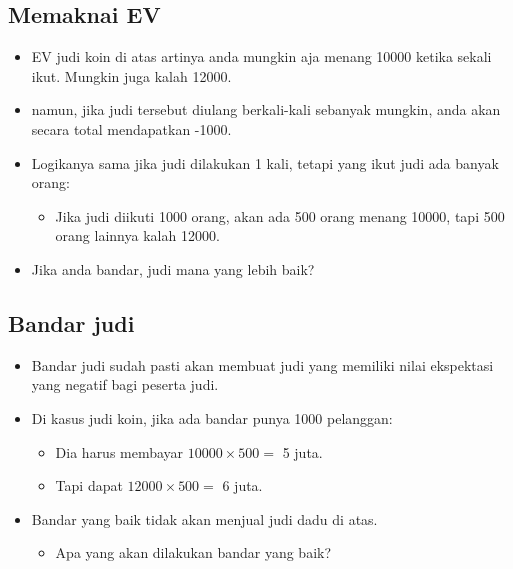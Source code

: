 \documentclass[
  letterpaper,
  DIV=11,
  numbers=noendperiod]{scrartcl}
\providecommand{\tightlist}{%
  \setlength{\itemsep}{0pt}\setlength{\parskip}{0pt}}\usepackage{longtable,booktabs,array}
\begin{document}
\subsection{Memaknai EV}\label{memaknai-ev}

\begin{itemize}
\item
  EV judi koin di atas artinya anda mungkin aja menang 10000 ketika
  sekali ikut. Mungkin juga kalah 12000.
\item
  namun, jika judi tersebut diulang berkali-kali sebanyak mungkin, anda
  akan secara total mendapatkan -1000.
\item
  Logikanya sama jika judi dilakukan 1 kali, tetapi yang ikut judi ada
  banyak orang:

  \begin{itemize}
  \tightlist
  \item
    Jika judi diikuti 1000 orang, akan ada 500 orang menang 10000, tapi
    500 orang lainnya kalah 12000.
  \end{itemize}
\item
  Jika anda bandar, judi mana yang lebih baik?
\end{itemize}

\subsection{Bandar judi}\label{bandar-judi}

\begin{itemize}
\item
  Bandar judi sudah pasti akan membuat judi yang memiliki nilai
  ekspektasi yang negatif bagi peserta judi.
\item
  Di kasus judi koin, jika ada bandar punya 1000 pelanggan:

  \begin{itemize}
  \item
    Dia harus membayar \(10000 \times 500=\) 5 juta.
  \item
    Tapi dapat \(12000 \times 500=\) 6 juta.
  \end{itemize}
\item
  Bandar yang baik tidak akan menjual judi dadu di atas.

  \begin{itemize}
  \tightlist
  \item
    Apa yang akan dilakukan bandar yang baik?
  \end{itemize}
\end{itemize}
\end{document}

